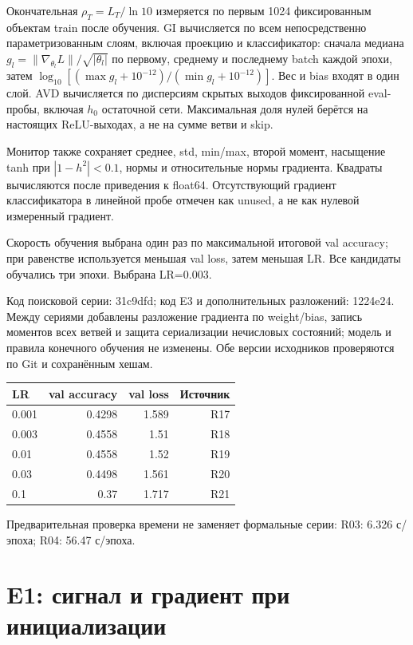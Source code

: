 \documentclass[10pt,a4paper]{article}
\begin{document}
Окончательная $\rho_T=L_T/\ln10$ измеряется по первым 1024 фиксированным объектам train после обучения. GI вычисляется по всем непосредственно параметризованным слоям, включая проекцию и классификатор: сначала медиана $g_l=\|\nabla_{\theta_l}L\|/\sqrt{|\theta_l|}$ по первому, среднему и последнему batch каждой эпохи, затем $\log_{10}[(\max g_l+10^{-12})/(\min g_l+10^{-12})]$. Вес и bias входят в один слой. AVD вычисляется по дисперсиям скрытых выходов фиксированной eval-пробы, включая $h_0$ остаточной сети. Максимальная доля нулей берётся на настоящих ReLU-выходах, а не на сумме ветви и skip.

Монитор также сохраняет среднее, std, min/max, второй момент, насыщение tanh при $|1-h^2|<0.1$, нормы и относительные нормы градиента. Квадраты вычисляются после приведения к float64. Отсутствующий градиент классификатора в линейной пробе отмечен как unused, а не как нулевой измеренный градиент.


Скорость обучения выбрана один раз по максимальной итоговой val accuracy; при равенстве используется меньшая val loss, затем меньшая LR. Все кандидаты обучались три эпохи. Выбрана LR=0.003.

Код поисковой серии: 31c9dfd; код E3 и дополнительных разложений: 1224e24. Между сериями добавлены разложение градиента по weight/bias, запись моментов всех ветвей и защита сериализации нечисловых состояний; модель и правила конечного обучения не изменены. Обе версии исходников проверяются по Git и сохранённым хешам.

\begin{center}\small
\begin{tabular}{lrrr}
\toprule
LR & val accuracy & val loss & Источник \\
\midrule
0.001 & 0.4298 & 1.589 & R17 \\
0.003 & 0.4558 & 1.51 & R18 \\
0.01 & 0.4558 & 1.52 & R19 \\
0.03 & 0.4498 & 1.561 & R20 \\
0.1 & 0.37 & 1.717 & R21 \\
\bottomrule
\end{tabular}\end{center}

Предварительная проверка времени не заменяет формальные серии: R03: 6.326 с/эпоха; R04: 56.47 с/эпоха.

\section{E1: сигнал и градиент при инициализации}
\end{document}
